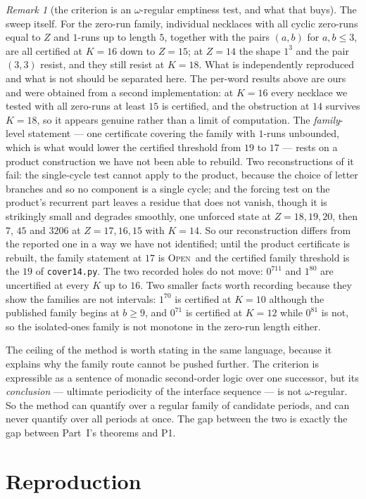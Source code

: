 \documentclass[11pt]{article}
\theoremstyle{definition}
\theoremstyle{remark}
\newtheorem{remark}[theorem]{Remark}
\newcommand{\OPEN}{\textsc{Open}}
\begin{document}
\begin{remark}[the criterion is an $\omega$-regular emptiness test, and what that buys]
The sweep itself. For the zero-run family, individual necklaces with all cyclic zero-runs equal to $Z$
and $1$-runs up to length $5$, together with the pairs $(a,b)$ for $a,b\le3$, are all certified at
$K=16$ down to $Z=15$; at $Z=14$ the shape $1^3$ and the pair $(3,3)$ resist, and they still resist at
$K=18$. What is independently reproduced and what is not should be separated here. The per-word results above
are ours and were obtained from a second implementation: at $K=16$ every necklace we tested with all
zero-runs at least $15$ is certified, and the obstruction at $14$ survives $K=18$, so it appears
genuine rather than a limit of computation. The \emph{family}-level statement --- one certificate
covering the family with $1$-runs unbounded, which is what would lower the certified threshold from $19$ to $17$ ---
rests on a product construction we have not been able to rebuild. Two reconstructions of it fail: the
single-cycle test cannot apply to the product, because the choice of letter branches and so no
component is a single cycle; and the forcing test on the product's recurrent part leaves a residue
that does not vanish, though it is strikingly small and degrades smoothly, one unforced state at
$Z=18,19,20$, then $7$, $45$ and $3206$ at $Z=17,16,15$ with $K=14$. So our reconstruction differs
from the reported one in a way we have not identified; until the product certificate is rebuilt, the
family statement at $17$ is \OPEN\ and the certified family threshold is the $19$ of \texttt{cover14.py}.
The two recorded holes do not move: $0^711$ and $1^80$ are uncertified at every $K$ up to $16$. Two
smaller facts worth recording because they show the families are not intervals: $1^70$ is certified at
$K=10$ although the published family begins at $b\ge9$, and $0^71$ is certified at $K=12$ while $0^81$
is not, so the isolated-ones family is not monotone in the zero-run length either.

The ceiling of the method is worth stating in the same language, because it explains why the family
route cannot be pushed further. The criterion is expressible as a sentence of monadic second-order
logic over one successor, but its \emph{conclusion} --- ultimate periodicity of the interface sequence
--- is not $\omega$-regular. So the method can quantify over a regular family of candidate periods, and
can never quantify over all periods at once. The gap between the two is exactly the gap between
Part~I's theorems and P1.
\end{remark}

\section{Reproduction}\label{ex:sec:repro}
\end{document}
